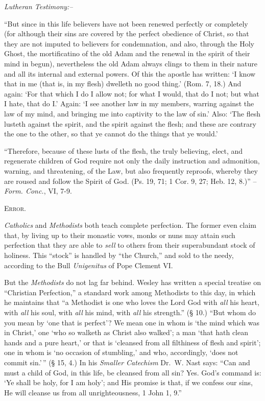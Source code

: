 \documentclass[
]{book}
\begin{document}
\begin{center}
\textsl{Lutheran Testimony:--}
\end{center}

``But since in this life believers have not been renewed perfectly or completely (for although their sins are covered by the perfect obedience of Christ, so that they are not imputed to believers for condemnation, and also, through the Holy Ghost, the mortificatino of the old Adam and the renewal in the spirit of their mind in begun), nevertheless the old Adam always clings to them in their nature and all its internal and external powers. Of this the apostle has written: `I know that in me (that is, in my flesh) dwelleth no good thing.' (Rom. 7, 18.) And again: `For that which I do I allow not; for what I would, that do I not; but what I hate, that do I.' Again: `I see another law in my members, warring against the law of my mind, and bringing me into captivity to the law of sin.' Also: `The flesh lusteth against the spirit, and the spirit against the flesh; and these are contrary the one to the other, so that ye cannot do the things that ye would.'

``Therefore, because of these lusts of the flesh, the truly believing, elect, and regenerate children of God require not only the daily instruction and admonition, warning, and threatening, of the Law, but also frequently reproofs, whereby they are roused and follow the Spirit of God. (Ps. 19, 71; 1 Cor. 9, 27; Heb. 12, 8.)'' -- \emph{Form. Conc.}, VI, 7-9.

\begin{center}
\textsc{Error.}
\end{center}

\emph{Catholics} and \emph{Methodists} both teach complete perfection. The former even claim that, by living up to their monastic vows, monks or nuns may attain such perfection that they are able to \emph{sell} to others from their superabundant stock of holiness. This ``stock'' is handled by ``the Church,'' and sold to the needy, according to the Bull \emph{Unigenitus} of Pope Clement VI.

But the \emph{Methodists} do not lag far behind. Wesley has written a special treatise on ``Christian Perfection,'' a standard work among Methodists to this day, in which he maintains that ``a Methodist is one who loves the Lord God with \emph{all} his heart, with \emph{all} his soul, with \emph{all} his mind, with \emph{all} his strength.'' (§ 10.) ``But whom do you mean by `one that is perfect'? We mean one in whom is `the mind which was in Christ,' one `who so walketh as Christ also walked'; a man `that hath clean hands and a pure heart,' or that is `cleansed from all filthiness of flesh and spirit'; one in whom is `no occasion of stumbling,' and who, accordingly, `does not commit sin.'\,'' (§ 15, 4.) In his \emph{Smaller Catechism} Dr.~W. Nast says: ``Can and must a child of God, in this life, be cleansed from all sin? Yes. God's command is: `Ye shall be holy, for I am holy'; and His promise is that, if we confess our sins, He will cleanse us from all unrighteousness, 1 John 1, 9.''
\end{document}
